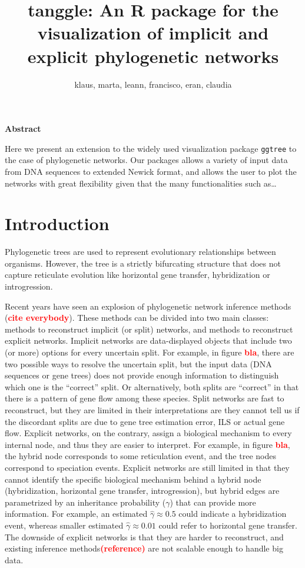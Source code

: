\documentclass[]{IEEEtran}
\title{tanggle: An R package for the visualization of implicit and explicit
phylogenetic networks}
\author{klaus, marta, leann, francisco, eran, claudia}
\date{}
\begin{document}
\maketitle

\begin{center}
\textbf{Abstract} 
\end{center}

Here we present an extension to the widely used visualization package
\texttt{ggtree} to the case of phylogenetic networks. Our packages
allows a variety of input data from DNA sequences to extended Newick
format, and allows the user to plot the networks with great flexibility
given that the many functionalities such as\ldots{}

\hypertarget{introduction}{%
\section{Introduction}\label{introduction}}

Phylogenetic trees are used to represent evolutionary relationships
between organisms. However, the tree is a strictly bifurcating structure
that does not capture reticulate evolution like horizontal gene
transfer, hybridization or introgression.

Recent years have seen an explosion of phylogenetic network inference
methods (\textcolor{red}{\textbf{cite everybody}}). These methods can be
divided into two main classes: methods to reconstruct implicit (or
split) networks, and methods to reconstruct explicit networks. Implicit
networks are data-displayed objects that include two (or more) options
for every uncertain split. For example, in figure
\textcolor{red}{\textbf{bla}}, there are two possible ways to resolve
the uncertain split, but the input data (DNA sequences or gene trees)
does not provide enough information to distinguish which one is the
``correct'' split. Or alternatively, both splits are ``correct'' in that
there is a pattern of gene flow among these species. Split networks are
fast to reconstruct, but they are limited in their interpretations are
they cannot tell us if the discordant splits are due to gene tree
estimation error, ILS or actual gene flow. Explicit networks, on the
contrary, assign a biological mechanism to every internal node, and thus
they are easier to interpret. For example, in figure
\textcolor{red}{\textbf{bla}}, the hybrid node corresponds to some
reticulation event, and the tree nodes correspond to speciation events.
Explicit networks are still limited in that they cannot identify the
specific biological mechanism behind a hybrid node (hybridization,
horizontal gene transfer, introgression), but hybrid edges are
parametrized by an inheritance probability (\(\gamma\)) that can provide
more information. For example, an estimated \(\hat{\gamma} \approx 0.5\)
could indicate a hybridization event, whereas smaller estimated
\(\hat{\gamma} \approx 0.01\) could refer to horizontal gene transfer.
The downside of explicit networks is that they are harder to
reconstruct, and existing inference
methods\textcolor{red}{\textbf{(reference)}} are not scalable enough to
handle big data.
\end{document}
